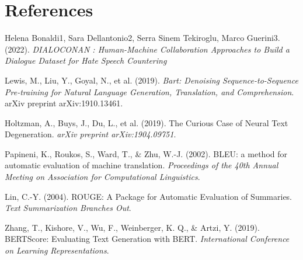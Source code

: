\documentclass[12pt]{article}
\begin{document}
\section{References}



\begin{thebibliography}{9}

Helena Bonaldi1, Sara Dellantonio2, Serra Sinem Tekiroglu, Marco Guerini3. (2022). \textit{DIALOCONAN : Human-Machine Collaboration Approaches to Build a Dialogue Dataset for Hate Speech Countering}

Lewis, M., Liu, Y., Goyal, N., et al. (2019). \textit{Bart: Denoising Sequence-to-Sequence Pre-training for Natural Language Generation, Translation, and Comprehension}. arXiv preprint arXiv:1910.13461.

Holtzman, A., Buys, J., Du, L., et al. (2019). The Curious Case of Neural Text Degeneration. \textit{arXiv preprint arXiv:1904.09751}.

Papineni, K., Roukos, S., Ward, T., \& Zhu, W.-J. (2002). BLEU: a method for automatic evaluation of machine translation. \textit{Proceedings of the 40th Annual Meeting on Association for Computational Linguistics}.

Lin, C.-Y. (2004). ROUGE: A Package for Automatic Evaluation of Summaries. \textit{Text Summarization Branches Out}.

Zhang, T., Kishore, V., Wu, F., Weinberger, K. Q., \& Artzi, Y. (2019). BERTScore: Evaluating Text Generation with BERT. \textit{International Conference on Learning Representations}.

\end{thebibliography}
\end{document}
